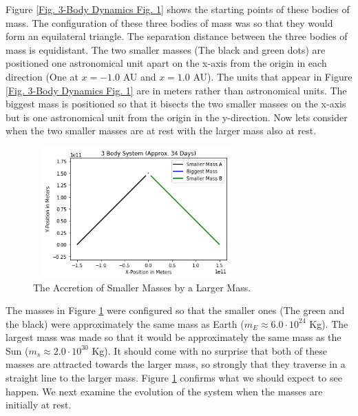 \documentclass[twocolumn]{article}
\begin{document}
\par \noindent
Figure \ref{Fig. 3-Body Dynamics Fig. 1} shows the starting points of these bodies of mass. The configuration of these three bodies of mass was so that they would form an equilateral triangle. The separation distance between the three bodies of mass is equidistant. The two smaller masses (The black and green dots) are positioned one astronomical unit apart on the x-axis from the origin in each direction (One at $x=-1.0$ AU and $x=1.0$ AU). The units that appear in Figure \ref{Fig. 3-Body Dynamics Fig. 1} are in meters rather than astronomical units. The biggest mass is positioned so that it bisects the two smaller masses on the x-axis but is one astronomical unit from the origin in the y-direction. Now lets consider when the two smaller masses are at rest with the larger mass also at rest.
\begin{figure}[h]
    \centering
    \includegraphics[width=8cm, height=5cm]{Figures/3-Body Dynamics (2).png}
    \caption{\small{The Accretion of Smaller Masses by a Larger Mass.}}
    \label{Fig. 3-Body Dynamics Fig. 2}
\end{figure}
\par \noindent
The masses in Figure \ref{Fig. 3-Body Dynamics Fig. 2} were configured so that the smaller ones (The green and the black) were approximately the same mass as Earth ($m_E\approx6.0\cdot10^{24}$ Kg). The largest mass was made so that it would be approximately the same mass as the Sun ($m_s\approx2.0\cdot10^{30}$ Kg). It should come with no surprise that both of these masses are attracted towards the larger mass, so strongly that they traverse in a straight line to the larger mass. Figure \ref{Fig. 3-Body Dynamics Fig. 2} confirms what we should expect to see happen. We next examine the evolution of the system when the masses are initially at rest.
\end{document}
